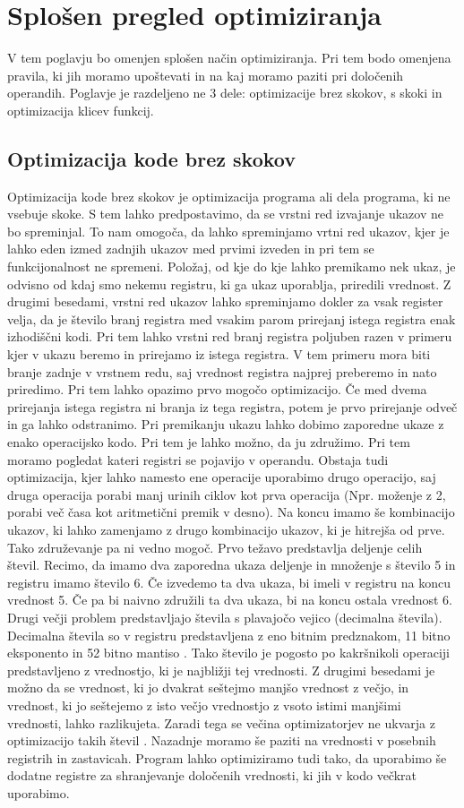 \documentclass[a4paper, 12pt]{book}
\begin{document}
\chapter{Splošen pregled optimiziranja}
V tem poglavju bo omenjen splošen način optimiziranja. Pri tem bodo omenjena pravila, ki jih moramo upoštevati in na kaj moramo paziti pri določenih operandih. Poglavje je razdeljeno ne 3 dele: optimizacije brez skokov, s skoki in optimizacija klicev funkcij.
\section{Optimizacija kode brez skokov}
\label{fl}
Optimizacija kode brez skokov je optimizacija programa ali dela programa, ki ne vsebuje skoke. S tem lahko predpostavimo, da se vrstni red izvajanje ukazov ne bo spreminjal. To nam omogoča, da lahko spreminjamo vrtni red ukazov, kjer je lahko eden izmed zadnjih ukazov med prvimi izveden in pri tem se funkcijonalnost ne spremeni. Položaj, od kje do kje lahko premikamo nek ukaz, je odvisno od kdaj smo nekemu registru, ki ga ukaz uporablja, priredili vrednost. Z drugimi besedami, vrstni red ukazov lahko spreminjamo dokler za vsak register velja, da je število branj registra med vsakim parom prirejanj istega registra enak izhodiščni kodi. Pri tem lahko vrstni red branj registra poljuben razen v primeru kjer v ukazu beremo in prirejamo iz istega registra. V tem primeru mora biti branje zadnje v vrstnem redu, saj vrednost registra najprej preberemo in nato priredimo. Pri tem lahko opazimo prvo mogočo optimizacijo. Če med dvema prirejanja istega registra ni branja iz tega registra, potem je prvo prirejanje odveč in ga lahko odstranimo. Pri premikanju ukazu lahko dobimo zaporedne ukaze z enako operacijsko kodo. Pri tem je lahko možno, da ju združimo. Pri tem moramo pogledat kateri registri se pojavijo v operandu. Obstaja tudi optimizacija, kjer lahko namesto ene operacije uporabimo drugo operacijo, saj druga operacija porabi manj urinih ciklov kot prva operacija (Npr. moženje z 2, porabi več časa kot aritmetični premik v desno). Na koncu imamo še kombinacijo ukazov, ki lahko zamenjamo z drugo kombinacijo ukazov, ki je hitrejša od prve. Tako združevanje pa ni vedno mogoč. Prvo težavo predstavlja deljenje celih števil. Recimo, da imamo dva zaporedna ukaza deljenje in množenje s število 5 in registru imamo število 6. Če izvedemo ta dva ukaza, bi imeli v registru na koncu vrednost 5. Če pa bi naivno združili ta dva ukaza, bi na koncu ostala vrednost 6. Drugi večji problem predstavljajo števila s plavajočo vejico (decimalna števila). Decimalna števila so v registru predstavljena z eno bitnim predznakom, 11 bitno eksponento in 52 bitno mantiso \cite{float}. Tako število je pogosto po kakršnikoli operaciji predstavljeno z vrednostjo, ki je najbližji tej vrednosti. Z drugimi besedami je možno da se vrednost, ki jo dvakrat seštejmo manjšo vrednost z večjo, in vrednost, ki jo seštejemo z isto večjo vrednostjo z vsoto istimi manjšimi vrednosti, lahko razlikujeta. Zaradi tega se večina optimizatorjev ne ukvarja z optimizacijo takih števil \cite{float2}. Nazadnje moramo še paziti na vrednosti v posebnih registrih in zastavicah. Program lahko optimiziramo tudi tako, da uporabimo še dodatne registre za shranjevanje določenih vrednosti, ki jih v kodo večkrat uporabimo.
\end{document}
